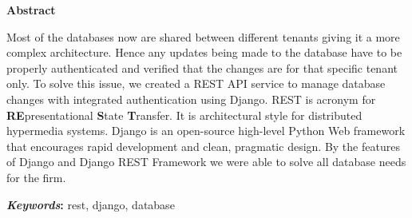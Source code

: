 \thispagestyle{empty} 
\vspace{1.0in}
\centerline{\Large{\bf Abstract}}
\vspace{.77cm}

Most of the databases now are shared between different tenants giving it a more
complex architecture. Hence any updates being made to the database have to be
properly authenticated and verified that the changes are for that specific
tenant only. To solve this issue, we created a REST API service to manage
database changes with integrated authentication using Django.
REST is acronym for {\bf{RE}}presentational {\bf{S}}tate {\bf{T}}ransfer.
It is architectural style for distributed hypermedia systems. Django is an
open-source high-level Python Web framework that encourages rapid development
and clean, pragmatic design. By the features of Django and Django REST
Framework we were able to solve all database needs for the firm.

\noindent\textbf{\textit{Keywords}:} rest, django, database
\begin{center}
\end{center}

\vspace{.3cm}

%

